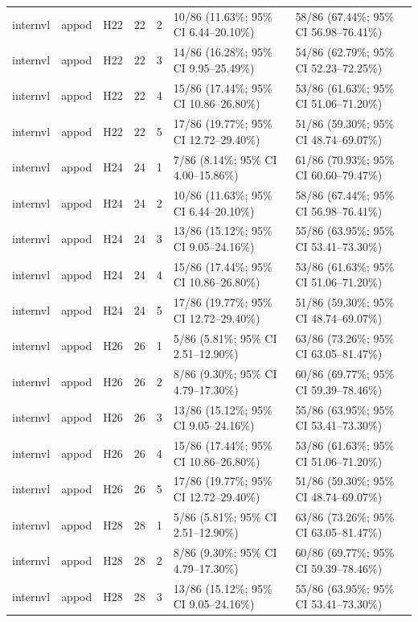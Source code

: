 \begin{longtable}{lllrrll}
internvl & appod & H22 & 22 & 2 & 10/86 (11.63\%; 95\% CI 6.44–20.10\%) & 58/86 (67.44\%; 95\% CI 56.98–76.41\%) \\
internvl & appod & H22 & 22 & 3 & 14/86 (16.28\%; 95\% CI 9.95–25.49\%) & 54/86 (62.79\%; 95\% CI 52.23–72.25\%) \\
internvl & appod & H22 & 22 & 4 & 15/86 (17.44\%; 95\% CI 10.86–26.80\%) & 53/86 (61.63\%; 95\% CI 51.06–71.20\%) \\
internvl & appod & H22 & 22 & 5 & 17/86 (19.77\%; 95\% CI 12.72–29.40\%) & 51/86 (59.30\%; 95\% CI 48.74–69.07\%) \\
internvl & appod & H24 & 24 & 1 & 7/86 (8.14\%; 95\% CI 4.00–15.86\%) & 61/86 (70.93\%; 95\% CI 60.60–79.47\%) \\
internvl & appod & H24 & 24 & 2 & 10/86 (11.63\%; 95\% CI 6.44–20.10\%) & 58/86 (67.44\%; 95\% CI 56.98–76.41\%) \\
internvl & appod & H24 & 24 & 3 & 13/86 (15.12\%; 95\% CI 9.05–24.16\%) & 55/86 (63.95\%; 95\% CI 53.41–73.30\%) \\
internvl & appod & H24 & 24 & 4 & 15/86 (17.44\%; 95\% CI 10.86–26.80\%) & 53/86 (61.63\%; 95\% CI 51.06–71.20\%) \\
internvl & appod & H24 & 24 & 5 & 17/86 (19.77\%; 95\% CI 12.72–29.40\%) & 51/86 (59.30\%; 95\% CI 48.74–69.07\%) \\
internvl & appod & H26 & 26 & 1 & 5/86 (5.81\%; 95\% CI 2.51–12.90\%) & 63/86 (73.26\%; 95\% CI 63.05–81.47\%) \\
internvl & appod & H26 & 26 & 2 & 8/86 (9.30\%; 95\% CI 4.79–17.30\%) & 60/86 (69.77\%; 95\% CI 59.39–78.46\%) \\
internvl & appod & H26 & 26 & 3 & 13/86 (15.12\%; 95\% CI 9.05–24.16\%) & 55/86 (63.95\%; 95\% CI 53.41–73.30\%) \\
internvl & appod & H26 & 26 & 4 & 15/86 (17.44\%; 95\% CI 10.86–26.80\%) & 53/86 (61.63\%; 95\% CI 51.06–71.20\%) \\
internvl & appod & H26 & 26 & 5 & 17/86 (19.77\%; 95\% CI 12.72–29.40\%) & 51/86 (59.30\%; 95\% CI 48.74–69.07\%) \\
internvl & appod & H28 & 28 & 1 & 5/86 (5.81\%; 95\% CI 2.51–12.90\%) & 63/86 (73.26\%; 95\% CI 63.05–81.47\%) \\
internvl & appod & H28 & 28 & 2 & 8/86 (9.30\%; 95\% CI 4.79–17.30\%) & 60/86 (69.77\%; 95\% CI 59.39–78.46\%) \\
internvl & appod & H28 & 28 & 3 & 13/86 (15.12\%; 95\% CI 9.05–24.16\%) & 55/86 (63.95\%; 95\% CI 53.41–73.30\%) \\

\end{longtable}
